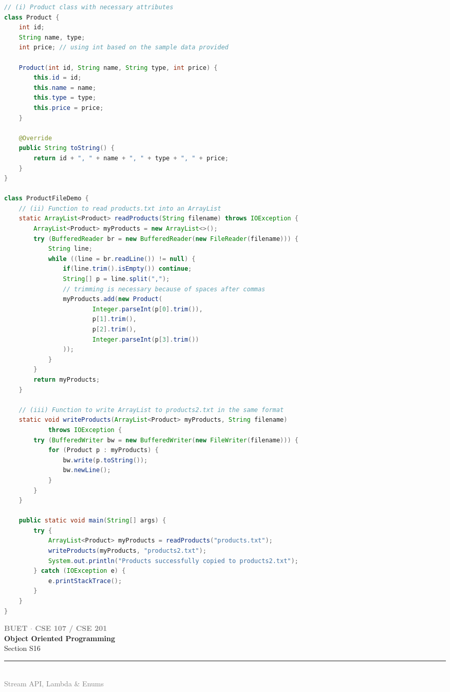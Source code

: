 \documentclass[12pt,a3paper]{article}
\newcommand{\secdivider}[4]{%
  \newpage\thispagestyle{empty}%
  \vspace*{\fill}%
  \begin{tcolorbox}[enhanced,colback=#4!7,colframe=#3,boxrule=1.5pt,arc=8pt,
    left=20pt,right=20pt,top=22pt,bottom=22pt,
    shadow={3pt}{-3pt}{0pt}{black!15}]
    \centering
    {\large\textcolor{gray}{\textbf{BUET $\cdot$ CSE 107 / CSE 201}}}\\[8pt]
    {\fontsize{26}{32}\selectfont\bfseries\textcolor{#3}{Object Oriented Programming}}\\[6pt]
    {\fontsize{15}{19}\selectfont\textcolor{dgray}{#1}}\\[12pt]
    \textcolor{#3!60}{\rule{0.5\textwidth}{0.5pt}}\\[6pt]
    {\small\textcolor{gray}{#2}}
  \end{tcolorbox}%
  \vspace*{\fill}\newpage%
}
\begin{document}
\begin{enumerate}
\begin{tcolorbox}[enhanced,breakable,ansbox,
  colback=cG!4,colframe=cG,boxrule=0.8pt,arc=5pt,
  title={\textbf{Answer --- Product Read/Write from File}},
  fonttitle=\bfseries\color{white},colbacktitle=cG]
\begin{lstlisting}[language=Java]
// (i) Product class with necessary attributes
class Product {
    int id; 
    String name, type; 
    int price; // using int based on the sample data provided

    Product(int id, String name, String type, int price) {
        this.id = id; 
        this.name = name; 
        this.type = type; 
        this.price = price;
    }

    @Override
    public String toString() {
        return id + ", " + name + ", " + type + ", " + price;
    }
}

class ProductFileDemo {
    // (ii) Function to read products.txt into an ArrayList
    static ArrayList<Product> readProducts(String filename) throws IOException {
        ArrayList<Product> myProducts = new ArrayList<>();
        try (BufferedReader br = new BufferedReader(new FileReader(filename))) {
            String line;
            while ((line = br.readLine()) != null) {
                if(line.trim().isEmpty()) continue;
                String[] p = line.split(",");
                // trimming is necessary because of spaces after commas
                myProducts.add(new Product(
                        Integer.parseInt(p[0].trim()),
                        p[1].trim(), 
                        p[2].trim(), 
                        Integer.parseInt(p[3].trim())
                ));
            }
        }
        return myProducts;
    }

    // (iii) Function to write ArrayList to products2.txt in the same format
    static void writeProducts(ArrayList<Product> myProducts, String filename) 
            throws IOException {
        try (BufferedWriter bw = new BufferedWriter(new FileWriter(filename))) {
            for (Product p : myProducts) {
                bw.write(p.toString());
                bw.newLine();
            }
        }
    }

    public static void main(String[] args) {
        try {
            ArrayList<Product> myProducts = readProducts("products.txt");
            writeProducts(myProducts, "products2.txt");
            System.out.println("Products successfully copied to products2.txt");
        } catch (IOException e) {
            e.printStackTrace();
        }
    }
}
\end{lstlisting}
\end{tcolorbox}

\end{enumerate}
\newpage

\secdivider{Section S16}{Stream API, Lambda \& Enums}{cH}{cH}
\label{sec:S16}
\titleformat{\section}{\large\bfseries\color{cH}}{}{0em}{}[\titlerule]
\end{document}
